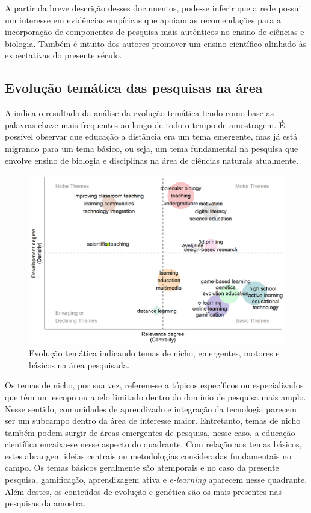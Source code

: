 \documentclass[portuguese]{textolivre}
\begin{document}
A partir da breve descrição desses documentos, pode-se inferir que a rede possui um interesse em evidências empíricas que apoiam as recomendações para a incorporação de componentes de pesquisa mais autênticos no ensino de ciências e biologia. Também é intuito dos autores promover um ensino científico alinhado às expectativas do presente século.

\subsection{Evolução temática das pesquisas na área}

A  indica o resultado da análise da evolução temática tendo como base as palavras-chave mais frequentes ao longo de todo o tempo de amostragem. É possível observar que educação a distância era um tema emergente, mas já está migrando para um tema básico, ou seja, um tema fundamental na pesquisa que envolve ensino de biologia e disciplinas na área de ciências naturais atualmente.

\begin{figure}[h!]
    \centering
    \includegraphics[width=0.8\linewidth]{Fig7.png}
    \caption{Evolução temática indicando temas de nicho, emergentes, motores e básicos na área pesquisada.}
    \label{fig7}
\end{figure}

Os temas de nicho, por sua vez, referem-se a tópicos específicos ou especializados que têm um escopo ou apelo limitado dentro do domínio de pesquisa mais amplo. Nesse sentido, comunidades de aprendizado e integração da tecnologia parecem ser um subcampo dentro da área de interesse maior. Entretanto, temas de nicho também podem surgir de áreas emergentes de pesquisa, nesse caso, a educação científica encaixa-se nesse aspecto do quadrante.
Com relação aos temas básicos, estes abrangem ideias centrais ou metodologias consideradas fundamentais no campo. Os temas básicos geralmente são atemporais e no caso da presente pesquisa, gamificação, aprendizagem ativa e \textit{e-learning} aparecem nesse quadrante. Além destes, os conteúdos de evolução e genética são os mais presentes nas pesquisas da amostra.
\end{document}
